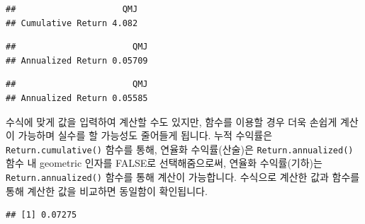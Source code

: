 \documentclass[12pt,]{book}
\newenvironment{Shaded}{\begin{snugshade}}{\end{snugshade}}
\newcommand{\CommentTok}[1]{\textcolor[rgb]{0.56,0.35,0.01}{\textit{#1}}}
\newcommand{\DataTypeTok}[1]{\textcolor[rgb]{0.13,0.29,0.53}{#1}}
\newcommand{\DecValTok}[1]{\textcolor[rgb]{0.00,0.00,0.81}{#1}}
\newcommand{\KeywordTok}[1]{\textcolor[rgb]{0.13,0.29,0.53}{\textbf{#1}}}
\newcommand{\NormalTok}[1]{#1}
\newcommand{\OperatorTok}[1]{\textcolor[rgb]{0.81,0.36,0.00}{\textbf{#1}}}
\newcommand{\OtherTok}[1]{\textcolor[rgb]{0.56,0.35,0.01}{#1}}
\newcommand{\StringTok}[1]{\textcolor[rgb]{0.31,0.60,0.02}{#1}}
\begin{document}
\begin{verbatim}
##                     QMJ
## Cumulative Return 4.082
\end{verbatim}

\begin{Shaded}
\end{Shaded}

\begin{verbatim}
##                       QMJ
## Annualized Return 0.05709
\end{verbatim}

\begin{Shaded}
\end{Shaded}

\begin{verbatim}
##                       QMJ
## Annualized Return 0.05585
\end{verbatim}

수식에 맞게 값을 입력하여 계산할 수도 있지만, 함수를 이용할 경우 더욱 손쉽게 계산이 가능하며 실수를 할 가능성도 줄어들게 됩니다. 누적 수익률은 \texttt{Return.cumulative()} 함수를 통해, 연율화 수익률(산술)은 \texttt{Return.annualized()} 함수 내 geometric 인자를 FALSE로 선택해줌으로써, 연율화 수익률(기하)는 \texttt{Return.annualized()} 함수를 통해 계산이 가능합니다. 수식으로 계산한 값과 함수를 통해 계산한 값을 비교하면 동일함이 확인됩니다.

\begin{Shaded}
\end{Shaded}

\begin{verbatim}
## [1] 0.07275
\end{verbatim}

\begin{Shaded}
\end{Shaded}
\end{document}
